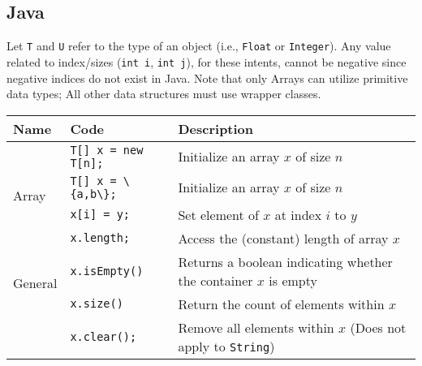 \documentclass{article}
\begin{document}
\subsection{Java}
Let \lstinline|T| and \lstinline|U| refer to the type of an object (i.e., \lstinline|Float| or \lstinline|Integer|). Any value related to index/sizes (\lstinline|int i|, \lstinline|int j|), for these intents, cannot be negative since negative indices do not exist in Java. Note that only Arrays can utilize primitive data types; All other data structures must use wrapper classes.
\setlength{\tabcolsep}{3pt}
\begin{center}\begin{tabularx}{\textwidth}{llX}\toprule
  Name & Code & Description\\\midrule
\multirow{4}{*}{Array} & \lstinline|T[] x = new T[n];| & Initialize an array \(x\) of size \(n\)\\
& \lstinline|T[] x = \{a,b\};| & Initialize an array \(x\) of size \(n\)\\
& \lstinline|x[i] = y;| & Set element of \(x\) at index \(i\) to \(y\)\\
& \lstinline|x.length;| & Access the (constant) length of array \(x\) \\\midrule

\multirow{2}{*}{General} & \lstinline|x.isEmpty()| & Returns a boolean indicating whether the container \(x\) is empty\\
& \lstinline|x.size()| & Return the count of elements within \(x\)\\
& \lstinline|x.clear();| & Remove all elements within \(x\) (Does not apply to \lstinline|String|)\\\midrule


\end{tabularx}
\end{center}
\end{document}
